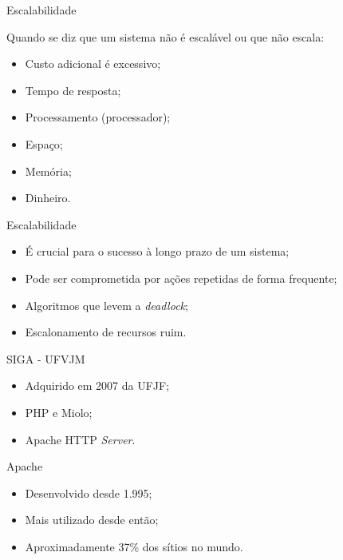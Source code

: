 \documentclass[aspectratio=43]{beamer}
\begin{document}
\begin{frame}{Escalabilidade}
	\begin{block}{}
	Quando se diz que um sistema não é escalável ou que não escala:
		\begin{itemize}
			\item Custo adicional é excessivo; \pause
			\item Tempo de resposta; \pause
			\item Processamento (processador); \pause
			\item Espaço; \pause
			\item Memória; \pause
			\item Dinheiro.
		\end{itemize}
	\end{block}
\end{frame}
\begin{frame}{Escalabilidade}
	\begin{block}{}
		\begin{itemize}
			\item É crucial para o sucesso à longo prazo de um sistema; \pause
			\item Pode ser comprometida por ações repetidas de forma frequente; 
			\pause
			\item Algoritmos que levem a \textit{deadlock}; \pause
			\item Escalonamento de recursos ruim.
		\end{itemize}
	\end{block}
\end{frame}
\begin{frame}
	\begin{block}{SIGA - UFVJM}
		\begin{itemize}
			\item Adquirido em 2007 da UFJF; \pause
			\item PHP e Miolo; \pause
			\item Apache HTTP \textit{Server}.
		\end{itemize}
	\end{block} \pause
	\begin{block}{Apache}
		\begin{itemize}
			\item Desenvolvido desde 1.995;
			\item Mais utilizado desde então;
			\item Aproximadamente 37\% dos sítios no mundo.
		\end{itemize}
	\end{block}
\end{frame}
\end{document}
